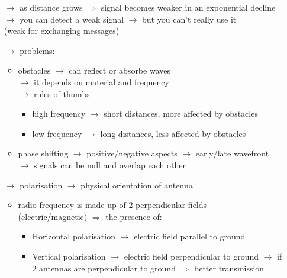 \begin{itemize}
    \begin{itemize}
        \item[$\rightarrow$] as distance grows $\Rightarrow$ signal becomes
        weaker in an exponential decline\\
        $\rightarrow$ you can detect a weak signal $\rightarrow$ but you can't
        really use it\\
        \hspace*{5cm}(weak for exchanging messages)
        \item[$\rightarrow$] problems:
        \begin{itemize}
            \item obstacles $\rightarrow$ can reflect or absorbe waves
            \\$\rightarrow$ it depends on material and frequency
            \\$\rightarrow$ rules of thumbs 
            \begin{itemize}
                \item high frequency $\rightarrow$ short distances, more affected
                by obstacles
                \item low frequency $\rightarrow$ long distances, less affected
                by obstacles
            \end{itemize}
            \item phase shifting $\rightarrow$ positive/negative aspects
            $\rightarrow$ early/late wavefront\\$\rightarrow$ signals can be null
            and overlap each other
        \end{itemize}
        \item[$\rightarrow$] polarisation $\rightarrow$ physical orientation of
        antenna
        \begin{itemize}
            \item radio frequency is made up of 2 perpendicular fields\\
            (electric/magnetic)
            $\Rightarrow$ the presence of:
            \begin{itemize}
                \item Horizontal polarisation $\rightarrow$ electric field
                parallel to ground
                \item Vertical polarisation $\rightarrow$ electric field
                perpendicular to ground
                $\rightarrow$ if 2 antennas are perpendicular to ground
                $\Rightarrow$ better transmission
            \end{itemize}
        \end{itemize}
    \end{itemize}
\end{itemize}

